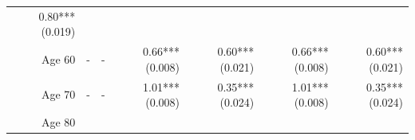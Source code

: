 \documentclass[]{article}
\begin{document}
\begin{longtable}[c]{@{}rrrrrrr@{}}
\begin{minipage}[t]{0.11\columnwidth}
0.80*** (0.019)
\strut\end{minipage}\tabularnewline
\begin{minipage}[t]{0.12\columnwidth}\raggedleft\strut
Age 60
\strut\end{minipage} &
\begin{minipage}[t]{0.11\columnwidth}\raggedleft\strut
-
\strut\end{minipage} &
\begin{minipage}[t]{0.12\columnwidth}\raggedleft\strut
-
\strut\end{minipage} &
\begin{minipage}[t]{0.11\columnwidth}\raggedleft\strut
0.66*** (0.008)
\strut\end{minipage} &
\begin{minipage}[t]{0.12\columnwidth}\raggedleft\strut
0.60*** (0.021)
\strut\end{minipage} &
\begin{minipage}[t]{0.11\columnwidth}\raggedleft\strut
0.66*** (0.008)
\strut\end{minipage} &
\begin{minipage}[t]{0.11\columnwidth}\raggedleft\strut
0.60*** (0.021)
\strut\end{minipage}\tabularnewline
\begin{minipage}[t]{0.12\columnwidth}\raggedleft\strut
Age 70
\strut\end{minipage} &
\begin{minipage}[t]{0.11\columnwidth}\raggedleft\strut
-
\strut\end{minipage} &
\begin{minipage}[t]{0.12\columnwidth}\raggedleft\strut
-
\strut\end{minipage} &
\begin{minipage}[t]{0.11\columnwidth}\raggedleft\strut
1.01*** (0.008)
\strut\end{minipage} &
\begin{minipage}[t]{0.12\columnwidth}\raggedleft\strut
0.35*** (0.024)
\strut\end{minipage} &
\begin{minipage}[t]{0.11\columnwidth}\raggedleft\strut
1.01*** (0.008)
\strut\end{minipage} &
\begin{minipage}[t]{0.11\columnwidth}\raggedleft\strut
0.35*** (0.024)
\strut\end{minipage}\tabularnewline
\begin{minipage}[t]{0.12\columnwidth}\raggedleft\strut
Age 80
\strut\end{minipage} &

\end{longtable}
\end{document}
